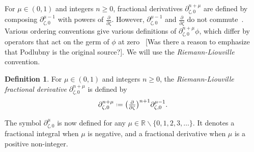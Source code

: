 \documentclass{article}
\newcommand{\R}{\mathbb{R}}
\newcommand{\fracderiv}[3]{\partial^{#1}_{#2, #3}}
\newcommand*{\defeq}{\mathrel{\vcenter{\baselineskip0.5ex \lineskiplimit0pt
                     \hbox{\scriptsize.}\hbox{\scriptsize.}}}%
                     =}
\theoremstyle{definition}
\newtheorem{definition}{Definition}[section]
\theoremstyle{plain}
\newenvironment{todo}{\color{Coral}}{\color{black}}
\begin{document}
For $\mu \in (0, 1)$ and integers $n \ge 0$, fractional derivatives $\fracderiv{n+\mu}{\zeta}{0}$ are defined by composing $\fracderiv{\mu-1}{\zeta}{0}$ with powers of $\tfrac{\partial}{\partial \zeta}$. However, $\fracderiv{\mu-1}{\zeta}{0}$ and $\tfrac{\partial}{\partial \zeta}$ do not commute~\cite[equation~54]{mladenov2014advanced}. Various ordering conventions give various definitions of $\fracderiv{n+\mu}{\zeta}{0} \phi$, which differ by operators that act on the germ of $\phi$ at zero~\cite[Section 1.3]{mladenov2014advanced}\cite{podlubny} \begin{todo}[Was there a reason to emphasize that Podlubny is the original source?]\end{todo}. We will use the {\em Riemann-Liouville} convention.
\begin{definition}\label{definition:frac_driv}
For $\mu \in (0, 1)$ and integers $n \ge 0$, the {\em Riemann-Liouville fractional derivative} $\fracderiv{n+\mu}{\zeta}{0}$ is defined by
\[ \fracderiv{n+\mu}{\zeta}{0} \defeq \big(\tfrac{\partial}{\partial \zeta}\big)^{n+1} \fracderiv{\mu-1}{\zeta}{0}. \]
\end{definition}
The symbol $\fracderiv{\mu}{\zeta}{0}$ is now defined for any $\mu \in \R \smallsetminus \{0, 1, 2, 3, \ldots\}$. It denotes a fractional integral when $\mu$ is negative, and a fractional derivative when $\mu$ is a positive non-integer.
\end{document}
